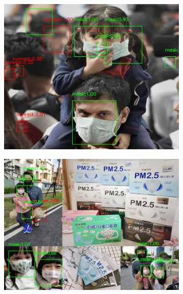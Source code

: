 \documentclass[10pt,a4paper]{report}
\begin{document}
\begin{figure}[hbtp]
     \centering
     \begin{subfigure}[b]{0.45\textwidth}
         \centering
         \includegraphics[width=\textwidth]{./imgs/bad/maksssksksss798.png}
     \end{subfigure}
     \hfill
     \begin{subfigure}[b]{0.45\textwidth}
         \centering
         \includegraphics[width=\textwidth]{./imgs/bad/maksssksksss799.png}
     \end{subfigure}
     \hfill
     \begin{subfigure}[b]{0.45\textwidth}

\end{subfigure}
\end{figure}
\end{document}
